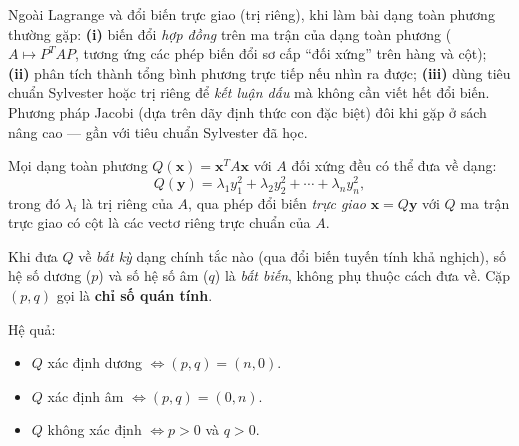 \documentclass[12pt,a4paper]{article}
\begin{document}
\begin{luuy}[title={Bài tập: nên biết thêm những gì?}]
Ngoài Lagrange và đổi biến trực giao (trị riêng), khi làm bài dạng toàn phương thường gặp: \textbf{(i)} biến đổi \emph{hợp đồng} trên ma trận của dạng toàn phương ($A \mapsto P^T A P$, tương ứng các phép biến đổi sơ cấp ``đối xứng'' trên hàng và cột); \textbf{(ii)} phân tích thành tổng bình phương trực tiếp nếu nhìn ra được; \textbf{(iii)} dùng tiêu chuẩn Sylvester hoặc trị riêng để \emph{kết luận dấu} mà không cần viết hết đổi biến. Phương pháp Jacobi (dựa trên dãy định thức con đặc biệt) đôi khi gặp ở sách nâng cao --- gần với tiêu chuẩn Sylvester đã học.
\end{luuy}

\begin{dinhly}[title={Đưa về dạng chính tắc trực giao}]
Mọi dạng toàn phương $Q(\mathbf{x}) = \mathbf{x}^T A \mathbf{x}$ với $A$ đối xứng đều có thể đưa về dạng:
\[
  Q(\mathbf{y}) = \lambda_1 y_1^2 + \lambda_2 y_2^2 + \cdots + \lambda_n y_n^2,
\]
trong đó $\lambda_i$ là trị riêng của $A$, qua phép đổi biến \emph{trực giao} $\mathbf{x} = Q\mathbf{y}$ với $Q$ ma trận trực giao có cột là các vectơ riêng trực chuẩn của $A$.
\end{dinhly}

\begin{dinhly}[title={Luật quán tính Sylvester}]
Khi đưa $Q$ về \emph{bất kỳ} dạng chính tắc nào (qua đổi biến tuyến tính khả nghịch), số hệ số dương ($p$) và số hệ số âm ($q$) là \emph{bất biến}, không phụ thuộc cách đưa về. Cặp $(p, q)$ gọi là \textbf{chỉ số quán tính}.

Hệ quả:
\begin{itemize}
  \item $Q$ xác định dương $\Leftrightarrow (p, q) = (n, 0)$.
  \item $Q$ xác định âm $\Leftrightarrow (p, q) = (0, n)$.
  \item $Q$ không xác định $\Leftrightarrow p > 0$ và $q > 0$.
\end{itemize}
\end{dinhly}
\end{document}
